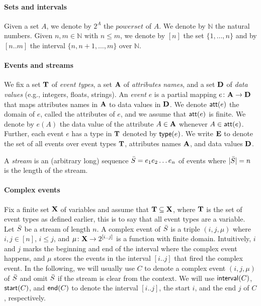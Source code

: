 
\paragraph{Sets and intervals} Given a set $A$, we denote by $2^{A}$ the $\textit{powerset}$ of $A$. We denote by $\mathbb{N}$ the natural numbers. Given $n,m \in \mathbb{N}$ with $n \leq m$, we denote by $[n]$ the set $\{1,\dots,n\}$ and by $[n..m]$ the interval $\{n,n+1,\dots,m\}$ over $\mathbb{N}$. %

\paragraph{Events and streams} We fix a set $\mathbf{T}$ of \textit{event types}, a set $\mathbf{A}$ of \textit{attributes names}, and a set $\mathbf{D}$ of \textit{data values} (e.g., integers, floats, strings). An \textit{event} $e$ is a partial mapping $e \colon \mathbf{A} \to \mathbf{D}$ that maps attributes names in $\mathbf{A}$ to data values in $\mathbf{D}$. We denote $\mathsf{att}(e)$ the domain of $e$, called the attributes of $e$, and we assume that $\mathsf{att}(e)$ is finite. We denote by $e(A)$ the data value of the attribute $A \in \mathbf{A}$ whenever $A \in \mathsf{att}(e)$. Further, each event $e$ has a type in $\mathbf{T}$ denoted by $\mathsf{type}(e)$. We write $\mathbf{E}$ to denote the set of all events over event types $\mathbf{T}$, attributes names $\mathbf{A}$, and data values $\mathbf{D}$.

A \textit{stream} is an (arbitrary long) sequence $\bar{S} = e_1 e_2 \dots e_n$ of events where $|\bar{S}| = n$ is the length of the stream.

\paragraph{Complex events} Fix a finite set $\mathbf{X}$ of variables and assume that $\mathbf{T} \subseteq \mathbf{X}$, where $\mathbf{T}$ is the set of event types as defined earlier, this is to say that all event types are a variable. Let $\bar{S}$ be a stream of length $n$. A complex event of $\bar{S}$ is a triple $(i, j, \mu)$ where $i, j \in [n]$, $i \leq j$, and $\mu \colon \mathbf{X} \to 2^{[i..j]}$ is a function with finite domain. Intuitively, $i$ and $j$ marks the beginning and end of the interval where the complex event happens, and $\mu$ stores the events in the interval $[i..j]$ that fired the complex event. In the following, we will usually use $C$ to denote a complex event $(i, j, \mu)$ of $\bar{S}$ and omit $\bar{S}$ if the stream is clear from the context. We will use $\mathsf{interval}(C)$, $\mathsf{start}(C)$, and $\mathsf{end}(C)$ to denote the interval $[i..j]$, the start $i$, and the end $j$ of $C$, respectively.

